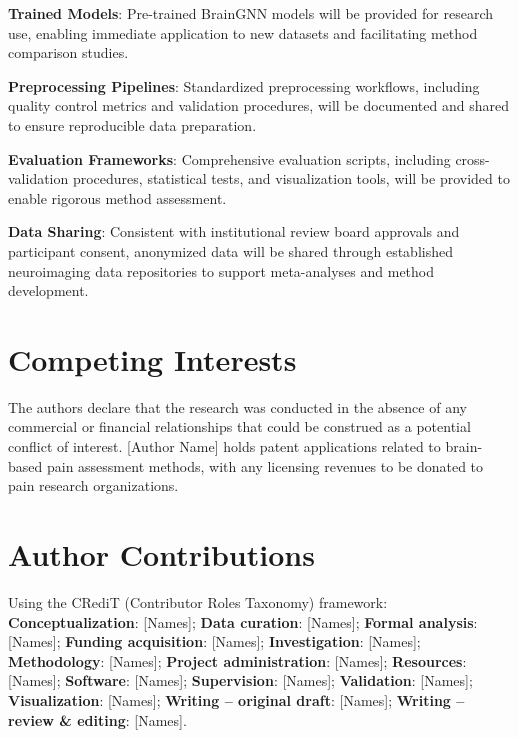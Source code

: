 \documentclass[10pt,journal,compsoc]{IEEEtran}
\begin{document}
\textbf{Trained Models}: Pre-trained BrainGNN models will be provided for research use, enabling immediate application to new datasets and facilitating method comparison studies.

\textbf{Preprocessing Pipelines}: Standardized preprocessing workflows, including quality control metrics and validation procedures, will be documented and shared to ensure reproducible data preparation.

\textbf{Evaluation Frameworks}: Comprehensive evaluation scripts, including cross-validation procedures, statistical tests, and visualization tools, will be provided to enable rigorous method assessment.

\textbf{Data Sharing}: Consistent with institutional review board approvals and participant consent, anonymized data will be shared through established neuroimaging data repositories to support meta-analyses and method development.

\section*{Competing Interests}

The authors declare that the research was conducted in the absence of any commercial or financial relationships that could be construed as a potential conflict of interest. [Author Name] holds patent applications related to brain-based pain assessment methods, with any licensing revenues to be donated to pain research organizations.

\section*{Author Contributions}

Using the CRediT (Contributor Roles Taxonomy) framework:
\textbf{Conceptualization}: [Names]; \textbf{Data curation}: [Names]; \textbf{Formal analysis}: [Names]; \textbf{Funding acquisition}: [Names]; \textbf{Investigation}: [Names]; \textbf{Methodology}: [Names]; \textbf{Project administration}: [Names]; \textbf{Resources}: [Names]; \textbf{Software}: [Names]; \textbf{Supervision}: [Names]; \textbf{Validation}: [Names]; \textbf{Visualization}: [Names]; \textbf{Writing -- original draft}: [Names]; \textbf{Writing -- review \& editing}: [Names].



\end{document}
